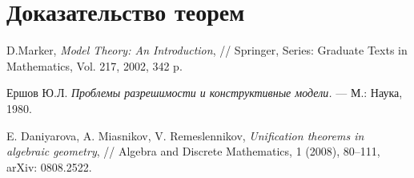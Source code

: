 \documentclass[a4paper,11pt,twoside]{article}
\newtheorem{lemma}{Лемма}[section]
\def\C{{\mathcal{C}}}
\begin{document}


\section{Доказательство теорем}\label{sec:TheoremProofs}



\begin{thebibliography}{}

 D.Marker, \textit{Model Theory: An Introduction}, // Springer, Series: Graduate Texts in Mathematics, Vol. 217, 2002, 342 p.

 Ершов Ю.Л. \textit{Проблемы разрешимости и конструктивные модели.} --- М.: Наука, 1980.

 E. Daniyarova, A. Miasnikov, V. Remeslennikov, \textit{Unification theorems in algebraic geometry}, // Algebra and Discrete Mathematics, 1 (2008), 80--111, arXiv: 0808.2522.


\end{thebibliography}
\end{document}
